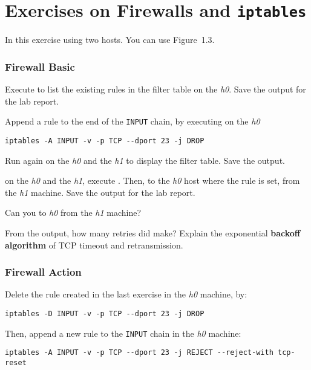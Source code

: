 \documentclass{../UTNetLab}
\begin{document}
\part{Exercises on Firewalls and \texttt{iptables}}
    In this exercise using two hosts.
    You can use Figure~1.3.

\section{Firewall Basic}
    Execute  to list the existing rules in the filter table on the \textit{h0}.
    Save the output for the lab report.

    Append a rule to the end of the \texttt{INPUT} chain, by executing on the \textit{h0}
    \begin{lstlisting}[morekeywords={[3]INPUT,TCP,DROP}]
iptables -A INPUT -v -p TCP --dport 23 -j DROP
    \end{lstlisting}
    
    Run  again on the \textit{h0} and the \textit{h1} to display the filter table.
    Save the output.

    on the \textit{h0} and the \textit{h1}, execute .
    Then,  to the \textit{h0} host where the rule is set, from the \textit{h1} machine.
    Save the  output for the lab report.

    \begin{report}
        \item Can you  to \textit{h0} from the \textit{h1} machine?
        
        \item From the  output, how many retries did  make?
        Explain the exponential \textbf{backoff algorithm} of TCP timeout and retransmission.
    \end{report}
    
\section{Firewall Action}
    Delete the rule created in the last exercise in the \textit{h0} machine, by:    
    \begin{lstlisting}[morekeywords={[3]INPUT,TCP,DROP}]
iptables -D INPUT -v -p TCP --dport 23 -j DROP
    \end{lstlisting}
    
    Then, append a new rule to the \texttt{INPUT} chain in the \textit{h0} machine:    
    \begin{lstlisting}[morekeywords={[3]INPUT,TCP,REJECT,tcp-reset}]
iptables -A INPUT -v -p TCP --dport 23 -j REJECT --reject-with tcp-reset
    \end{lstlisting}
    
\end{document}
